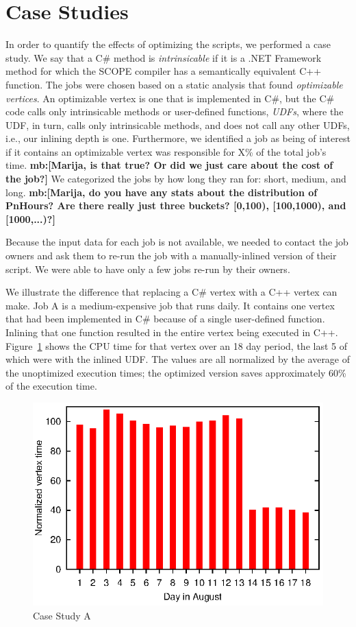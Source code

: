 \section{Case Studies}
\label{sec:caseStudy}
In order to quantify the effects of optimizing the scripts, we performed a case study.
We say that a C\# method is {\em intrinsicable} if it is a .NET Framework method for which the SCOPE compiler has a semantically equivalent C++ function.
The jobs were chosen based on a static analysis that found {\em optimizable vertices}.
An optimizable vertex is one that is implemented in C\#, but the C\# code calls only intrinsicable methods or user-defined functions, {\em UDFs}, where the UDF, in turn, calls only intrinsicable methods, and does not call any other UDFs, i.e., our inlining depth is one.
Furthermore, we identified a job as being of interest if it contains an optimizable vertex was responsible for X\% of the total job's time.
{\bf mb:[Marija, is that true? Or did we just care about the cost of the job?]}
We categorized the jobs by how long they ran for: short, medium, and long.
{\bf mb:[Marija, do you have any stats about the distribution of PnHours? Are there really just three buckets? [0,100), [100,1000), and [1000,...)?]}

Because the input data for each job is not available, we needed to contact the job owners and ask them to re-run the job with a manually-inlined version of their script.
We were able to have only a few jobs re-run by their owners.

We illustrate the difference that replacing a C\# vertex with a C++ vertex can make.
Job A is a medium-expensive job that runs daily.
It contains one vertex that had been implemented in  C\# because of a single user-defined function.
Inlining that one function resulted in the entire vertex being executed in C++.
Figure~\ref{fig:CaseStudyA} shows the CPU time for that vertex over an 18 day period, the last 5 of which were with the inlined UDF.
The values are all normalized by the average of the unoptimized execution times; the optimized version saves approximately 60\% of the execution time.

\begin{figure}[ht]
\includegraphics{graphs/normalizedTimes}
\caption{Case Study A \label{fig:CaseStudyA}}
\end{figure}

